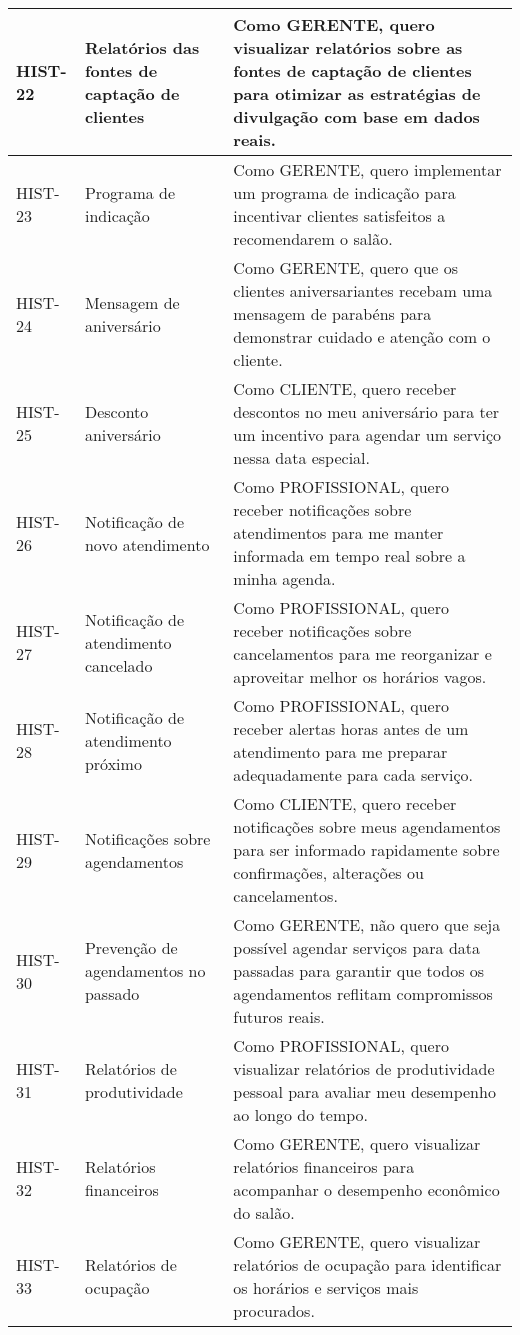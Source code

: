 \begin{longtable}{|p{2cm}|p{4cm}|p{9cm}|}
	HIST-22 & Relatórios das fontes de captação de clientes & Como GERENTE, quero visualizar relatórios sobre as fontes de captação de clientes para otimizar as estratégias de divulgação com base em dados reais. \\ \hline
	HIST-23 & Programa de indicação & Como GERENTE, quero implementar um programa de indicação para incentivar clientes satisfeitos a recomendarem o salão. \\ \hline
	HIST-24 & Mensagem de aniversário & Como GERENTE, quero que os clientes aniversariantes recebam uma mensagem de parabéns para demonstrar cuidado e atenção com o cliente. \\ \hline
	HIST-25 & Desconto aniversário & Como CLIENTE, quero receber descontos no meu aniversário para ter um incentivo para agendar um serviço nessa data especial. \\ \hline
	HIST-26 & Notificação de novo atendimento & Como PROFISSIONAL, quero receber notificações sobre atendimentos para me manter informada em tempo real sobre a minha agenda. \\ \hline
	HIST-27 & Notificação de atendimento cancelado & Como PROFISSIONAL, quero receber notificações sobre cancelamentos para me reorganizar e aproveitar melhor os horários vagos. \\ \hline
	HIST-28 & Notificação de atendimento próximo & Como PROFISSIONAL, quero receber alertas horas antes de um atendimento para me preparar adequadamente para cada serviço. \\ \hline
	HIST-29 & Notificações sobre agendamentos & Como CLIENTE, quero receber notificações sobre meus agendamentos para ser informado rapidamente sobre confirmações, alterações ou cancelamentos. \\ \hline
	HIST-30 & Prevenção de agendamentos no passado & Como GERENTE, não quero que seja possível agendar serviços para data passadas para garantir que todos os agendamentos reflitam compromissos futuros reais. \\ \hline
	HIST-31 & Relatórios de produtividade & Como PROFISSIONAL, quero visualizar relatórios de produtividade pessoal para avaliar meu desempenho ao longo do tempo. \\ \hline
	HIST-32 & Relatórios financeiros & Como GERENTE, quero visualizar relatórios financeiros  para acompanhar o desempenho econômico do salão. \\ \hline
	HIST-33 & Relatórios de ocupação & Como GERENTE, quero visualizar relatórios de ocupação para identificar os horários e serviços mais procurados. \\ \hline

\end{longtable}
